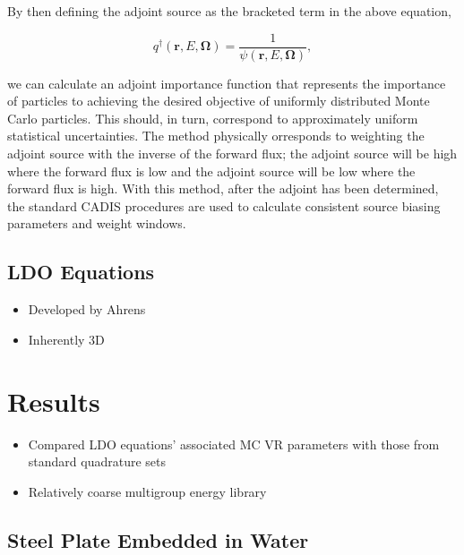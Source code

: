 \documentclass{article} %
\newcommand{\bo}{\mathbf\Omega}
\newcommand{\vecr}{\textbf{r}}
\begin{document}
\noindent By then defining the adjoint source as the bracketed term in the
above equation,

\begin{equation}
q^{\dagger}(\vecr,E,\bo) = \frac{1}{\psi(\vecr,E,\bo)},
\end{equation}

\noindent we can calculate an adjoint importance function that represents the
importance of particles to achieving the desired objective of uniformly
distributed Monte Carlo particles. This should, in turn, correspond to
approximately uniform statistical uncertainties. The method physically 
orresponds to weighting the adjoint source with the inverse of the forward
flux; the adjoint source will be high where the forward flux is low and the
adjoint source will be low where the forward flux is high. With this method,
after the adjoint has been determined, the standard CADIS procedures are used
to calculate consistent source biasing parameters and weight windows.

\subsection{LDO Equations}

\begin{itemize}
\item{Developed by Ahrens}
\item{Inherently 3D}
\end{itemize}

\section{Results}
\label{sec:results}

\begin{itemize}
\item{Compared LDO equations' associated MC VR parameters with those from
      standard quadrature sets}
\item{Relatively coarse multigroup energy library}
\end{itemize}

\subsection{Steel Plate Embedded in Water}
\end{document}
